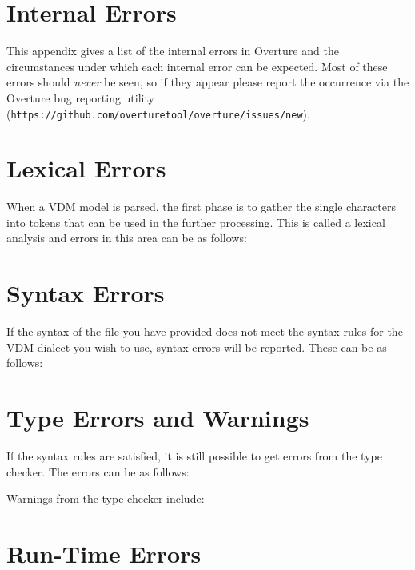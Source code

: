 \documentclass{overturerepchap}
\newcommand{\url}[1]{\texttt{#1}}
\begin{document}
\newpage
\chapter{Internal Errors}\label{app:internalerrors}

This appendix gives a list of the internal errors in Overture
and the circumstances under which each internal error can be expected.
Most of these errors should \emph{never} be seen, so if they appear
please report the occurrence via the Overture bug reporting utility
(\url{https://github.com/overturetool/overture/issues/new}).



\newpage
\chapter{Lexical Errors}\label{app:lexerr}

When a VDM model is parsed, the first phase is to gather the single
characters into tokens that can be used in the further
processing. This is called a lexical analysis and errors in this area
can be as follows:



\newpage
\chapter{Syntax Errors}\label{app:synerr}

If the syntax of the file you have provided does not meet the
syntax rules for the VDM dialect you wish to use, syntax errors will be
reported. These can be as follows:



\newpage
\chapter{Type Errors and Warnings}\label{app:typeerr}

If the syntax rules are satisfied, it is still possible to get
errors from the type checker. The errors can be as
follows:



Warnings from the type checker include:



\newpage
\chapter{Run-Time Errors}\label{app:runtimeerr}
\end{document}
